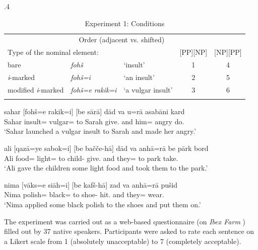 \documentclass[output=paper]{langsci/langscibook}
\begin{document}
\begin{table}
  \tabcolsep.4\tabcolsep %
	\begin{tabular}{lllcc}
      \lsptoprule 
		\multicolumn{3}{l}{} & \multicolumn{2}{c}{Order (adjacent vs. shifted)}\\\cmidrule(lr){4-5}
		\multicolumn{3}{l}{Type of the nominal element:} & [PP][NP] & [NP][PP]\\ 
		\midrule 
		bare &  \textit{foh\v{s}} & `insult' & 1 & 4\\ 
		\textit{i}-marked & \textit{foh\v{s}=i} & `an insult' & 2 & 5\\ 
		modified \textit{i}-marked & \textit{foh\v{s}=e rakik=i} & `a vulgar insult' & 3 & 6\\ 
    \lspbottomrule 
	\end{tabular}
	\caption{Experiment 1: Conditions\label{Tab:Exp1-Design}}
\end{table}

\begin{exe}
	\ex\label{fohs-exp}
	\gll sahar [foh\v{s}=e rakik=i] [be s\=ar\=a]   d\=ad va u=r\=a asab\=ani kard\\
	Sahar   insult= vulgar= to Sarah give. and him= angry do.\\
	\glt	`Sahar launched a vulgar insult to Sarah and made her angry.'
	
	\ex\label{qaza-exp}
	\gll ali   [qaz\=a=ye sabok=i] [be ba\v{c}\v{c}e-h\=a] d\=ad va anh\=a=r\=a be p\=ark bord\\
	Ali  food= light= to child-  give. and they= to park take.\\
	\glt	`Ali  gave the children some light food and took them to the park.'
	
	\ex\label{vaks-exp}
	\gll nima   [v\=aks=e si\=ah=i] [be kaf\v{s}-h\=a] zad va anh\=a=r\=a pu\v{s}id\\
	Nima  polish= black= to shoe-   hit. and they= wear.\\
	\glt	`Nima applied some black polish to the shoes and put them on.'
\end{exe}

The experiment was carried out as a web-based questionnaire (on \textit{Ibex Farm} \citep{ibex}) filled out by 37 native speakers. Participants were asked to rate each sentence on a Likert scale from 1 (absolutely unacceptable) to 7 (completely acceptable).
\end{document}
